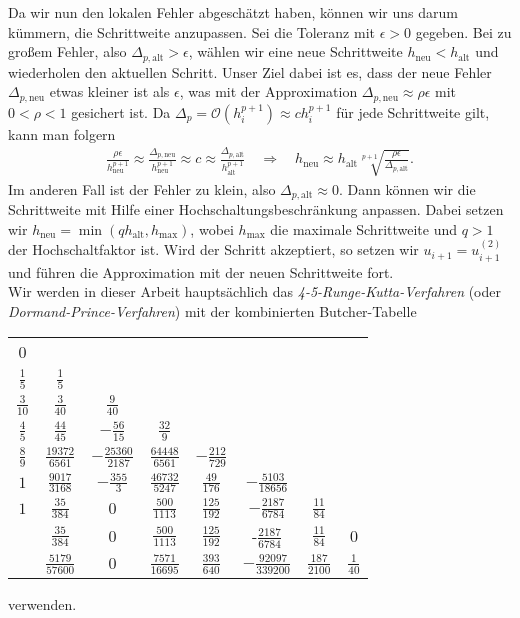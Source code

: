Da wir nun den lokalen Fehler abgeschätzt haben, können wir uns darum kümmern, die Schrittweite anzupassen. Sei die
Toleranz mit $\epsilon>0$ gegeben. Bei zu großem Fehler, also $\Delta_{p, \text{alt}} > \epsilon$, wählen wir eine neue
Schrittweite $h_{\text{neu}}<h_{\text{alt}}$ und wiederholen den aktuellen Schritt. Unser Ziel dabei ist es, dass der
neue Fehler $\Delta_{p, \text{neu}}$ etwas kleiner ist als $\epsilon$, was mit der Approximation $\Delta_{p, \text{neu}} \approx \rho \epsilon$ mit
$0 < \rho < 1$ gesichert ist. Da $\Delta_p = \mathcal{O}(h_i^{p+1}) \approx ch_i^{p+1}$ für jede Schrittweite gilt, kann man folgern
\begin{align*}
    \frac{\rho \epsilon}{h_{\text{neu}}^{p+1}}
    \approx \frac{\Delta_{p, \text{neu}}}{h_{\text{neu}}^{p+1}}
    \approx c
    \approx \frac{\Delta_{p, \text{alt}}}{h_{\text{alt}}^{p+1}}
    \quad \Rightarrow \quad
    h_{\text{neu}} \approx h_{\text{alt}} \sqrt[p+1]{\frac{\rho \epsilon}{\Delta_{p, \text{alt}}}}.
\end{align*}
Im anderen Fall ist der Fehler zu klein, also $\Delta_{p, \text{alt}} \approx 0$. Dann können wir die Schrittweite mit Hilfe
einer Hochschaltungsbeschränkung anpassen. Dabei setzen wir $h_{\text{neu}} = \min(q h_{\text{alt}}, h_{\text{max}})$,
wobei $h_{\text{max}}$ die maximale Schrittweite und $q>1$ der Hochschaltfaktor ist. Wird der Schritt akzeptiert, so
setzen wir $u_{i+1} = u_{i+1}^{(2)}$ und führen die Approximation mit der neuen Schrittweite fort.\\
Wir werden in dieser Arbeit hauptsächlich das \textit{4-5-Runge-Kutta-Verfahren} (oder \textit{Dormand-Prince-Verfahren})
mit der kombinierten Butcher-Tabelle
\begin{center}
    \begin{tabular}{c | c c c c c c c}
        0 & & & & & & & \\
        $\frac{1}{5}$ & $\frac{1}{5}$ & & & & & & \\
        $\frac{3}{10}$ & $\frac{3}{40}$ & $\frac{9}{40}$ & & & & & \\
        $\frac{4}{5}$ & $\frac{44}{45}$ & $-\frac{56}{15}$ & $\frac{32}{9}$ & & & & \\
        $\frac{8}{9}$ & $\frac{19372}{6561}$ & $-\frac{25360}{2187}$ & $\frac{64448}{6561}$ & $-\frac{212}{729}$ & & & \\
        $1$ & $\frac{9017}{3168}$ & $-\frac{355}{3}$ & $\frac{46732}{5247}$ & $\frac{49}{176}$ & $-\frac{5103}{18656}$ & & \\
        $1$ & $\frac{35}{384}$ & $0$ & $\frac{500}{1113}$ & $\frac{125}{192}$ & $-\frac{2187}{6784}$ & $\frac{11}{84}$ & \\
        \hline
        & $\frac{35}{384}$ & $0$ & $\frac{500}{1113}$ & $\frac{125}{192}$ & -$\frac{2187}{6784}$ & $\frac{11}{84}$ & $0$\\
        \hline
        & $\frac{5179}{57600}$ &  $0$ & $\frac{7571}{16695}$ & $\frac{393}{640}$ & $-\frac{92097}{339200}$
        & $\frac{187}{2100}$ & $\frac{1}{40}$ \\
    \end{tabular}
\end{center}
verwenden.

